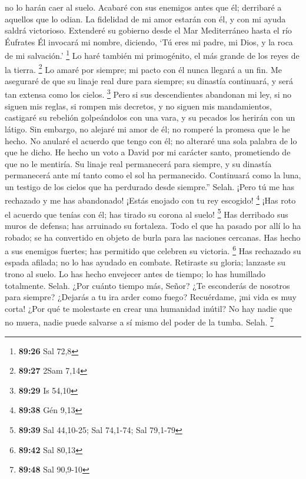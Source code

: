 no lo harán caer al suelo.  Acabaré con sus enemigos antes
que él; derribaré a aquellos que lo odian.  La fidelidad de
mi amor estarán con él, y con mi ayuda saldrá victorioso. 
Extenderé su gobierno desde el Mar Mediterráneo hasta el río Éufrates
 Él invocará mi nombre, diciendo, `Tú eres mi padre, mi
Dios, y la roca de mi salvación.' \footnote{\textbf{89:26} Sal 72,8}
 Lo haré también mi primogénito, el más grande de los reyes
de la tierra. \footnote{\textbf{89:27} 2Sam 7,14}  Lo amaré
por siempre; mi pacto con él nunca llegará a un fin.  Me
aseguraré de que su linaje real dure para siempre; su dinastía
continuará, y será tan extensa como los cielos. \footnote{\textbf{89:29}
  Is 54,10}  Pero si sus descendientes abandonan mi ley, si
no siguen mis reglas,  si rompen mis decretos, y no siguen
mis mandamientos,  castigaré su rebelión golpeándolos con
una vara, y su pecados los herirán con un látigo.  Sin
embargo, no alejaré mi amor de él; no romperé la promesa que le he
hecho.  No anularé el acuerdo que tengo con él; no alteraré
una sola palabra de lo que he dicho.  He hecho un voto a
David por mi carácter santo, prometiendo de que no le mentiría.
 Su linaje real permanecerá para siempre, y su dinastía
permanecerá ante mí tanto como el sol ha permanecido. 
Continuará como la luna, un testigo de los cielos que ha perdurado desde
siempre.'' Selah.  ¡Pero tú me has rechazado y me has
abandonado! ¡Estás enojado con tu rey escogido! \footnote{\textbf{89:38}
  Gén 9,13}  ¡Has roto el acuerdo que tenías con él; has
tirado su corona al suelo! \footnote{\textbf{89:39} Sal 44,10-25; Sal
  74,1-74; Sal 79,1-79}  Has derribado sus muros de
defensa; has arruinado su fortaleza.  Todo el que ha pasado
por allí lo ha robado; se ha convertido en objeto de burla para las
naciones cercanas.  Has hecho a sus enemigos fuertes; has
permitido que celebren su victoria. \footnote{\textbf{89:42} Sal 80,13}
 Has rechazado su espada afilada; no lo has ayudado en
combate.  Retiraste su gloria; lanzaste su trono al suelo.
 Lo has hecho envejecer antes de tiempo; lo has humillado
totalmente. Selah.  ¿Por cuánto tiempo más, Señor? ¿Te
esconderás de nosotros para siempre? ¿Dejarás a tu ira arder como fuego?
 Recuérdame, ¡mi vida es muy corta! ¿Por qué te molestaste
en crear una humanidad inútil?  No hay nadie que no muera,
nadie puede salvarse a sí mismo del poder de la tumba. Selah.
\footnote{\textbf{89:48} Sal 90,9-10}

